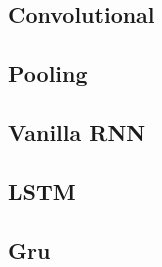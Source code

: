\documentclass[12pt]{article}
\begin{document}
	\subsection{Convolutional}
	\subsection{Pooling}
	\subsection{Vanilla RNN}
	\subsection{LSTM}
	\subsection{Gru}
\end{document}
